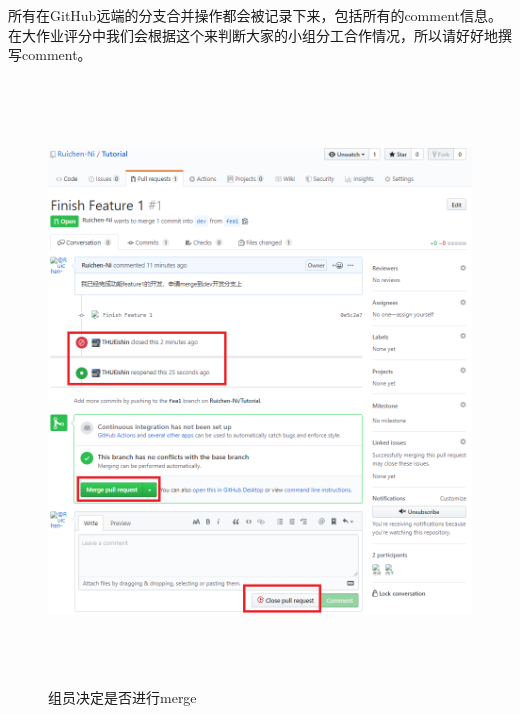 \documentclass[a4paper,14pt]{article}
\begin{document}
\begin{enumerate}[1. ]
所有在GitHub远端的分支合并操作都会被记录下来，包括所有的comment信息。在大作业评分中我们会根据这个来判断大家的小组分工合作情况，所以请好好地撰写comment。
\begin{figure}[h]
\centering
\includegraphics[height=16cm]{figure/step11}
\caption{组员决定是否进行merge}
\end{figure}


\end{enumerate}
\end{document}

